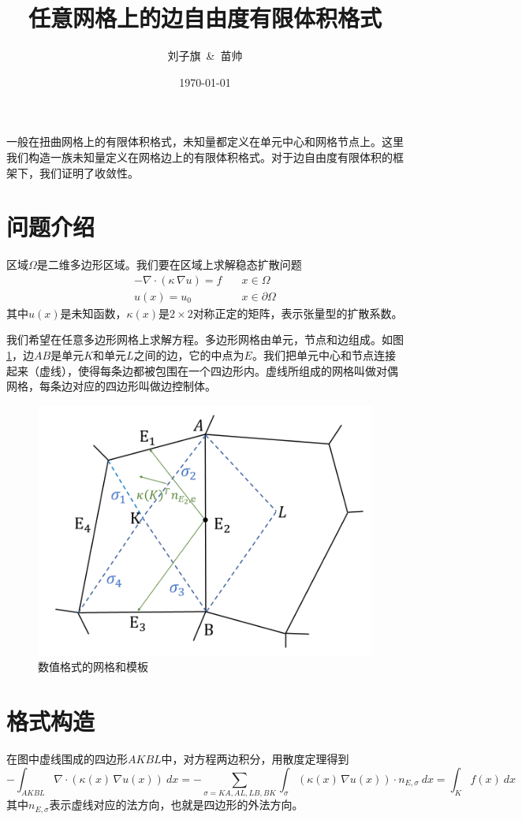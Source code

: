 \documentclass[12pt,a4paper]{article}
\title{任意网格上的边自由度有限体积格式}
\author{刘子旗~\&~苗帅}
\date{\today}
\theoremstyle{plain}
\begin{document}
\maketitle

一般在扭曲网格上的有限体积格式，未知量都定义在单元中心和网格节点上。这里我们构造一族未知量定义在网格边上的有限体积格式。对于边自由度有限体积的框架下，我们证明了收敛性。

\section*{问题介绍}

区域$\Omega$是二维多边形区域。我们要在区域上求解稳态扩散问题
\begin{equation*}
\begin{split}
- \nabla \cdot (\kappa \, \nabla u) = f & \quad x \in \Omega \\
u(x) = u_0 & \quad x \in \partial \Omega
\end{split}
\end{equation*}
其中$u(x)$是未知函数，$\kappa(x)$是$2 \times 2$对称正定的矩阵，表示张量型的扩散系数。

我们希望在任意多边形网格上求解方程。多边形网格由单元，节点和边组成。如图\ref{f1}，边$AB$是单元$K$和单元$L$之间的边，它的中点为$E$。我们把单元中心和节点连接起来（虚线），使得每条边都被包围在一个四边形内。虚线所组成的网格叫做对偶网格，每条边对应的四边形叫做边控制体。

\begin{figure}[h]
\centering
\includegraphics[width=0.5\linewidth]{stencil.png}
\caption{数值格式的网格和模板}
\label{f1}
\end{figure}

\section*{格式构造}

在图中虚线围成的四边形$AKBL$中，对方程两边积分，用散度定理得到
\begin{equation*}
- \int_{AKBL} \nabla \cdot (\kappa(x) \, \nabla u(x)) \ dx = - \sum_{\sigma = KA, AL, LB, BK} \int_{\sigma} (\kappa(x) \, \nabla u(x)) \cdot n_{E, \sigma} \ dx = \int_{K} f(x) \ dx
\end{equation*}
其中$n_{E, \sigma}$表示虚线对应的法方向，也就是四边形的外法方向。
\end{document}
